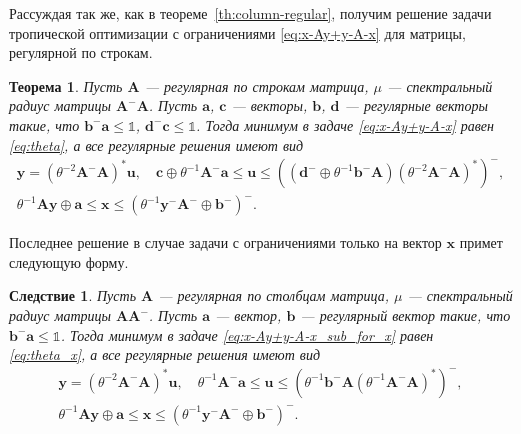 \documentclass[specialist,
               substylefile = spbu.rtx,
               subf,href,colorlinks=true, 12pt]{disser}
\newtheorem{theorem}{Теорема}
\newtheorem{corollary}{Следствие}
\theoremstyle{definition}
\begin{document}
Рассуждая так же, как в теореме~\ref{th:column-regular}, получим решение задачи тропической оптимизации с ограничениями \eqref{eq:x-Ay+y-A-x} для матрицы, регулярной по строкам.
\begin{theorem}\label{th:row-regular}
Пусть $\bm{A}$ --- регулярная по строкам матрица, $\mu$ --- спектральный радиус матрицы $\bm{A}^{-}\bm{A}$. Пусть $\bm{a}$, $\bm{c}$ --- векторы, $\bm{b}$, $\bm{d}$ --- регулярные векторы такие, что $\bm{b}^{-}\bm{a}\leq\mathbb{1}$, $\bm{d}^{-}\bm{c}\leq\mathbb{1}$. 
Тогда минимум в задаче \eqref{eq:x-Ay+y-A-x} равен \eqref{eq:theta}, а все регулярные решения имеют вид
\begin{gather*}
\bm{y}=(\theta^{-2}\bm{A}^{-}\bm{A})^{\ast}\bm{u},
\quad
\bm{c}
\oplus
\theta^{-1}\bm{A}^{-}\bm{a}
\leq
\bm{u}
\leq
((\bm{d}^{-}\oplus\theta^{-1}\bm{b}^{-}\bm{A})
(\theta^{-2}\bm{A}^{-}\bm{A})^{\ast})^{-},\\
\theta^{-1}\bm{A}\bm{y}\oplus\bm{a}
\leq
\bm{x}
\leq
(\theta^{-1}\bm{y}^{-}\bm{A}^{-}\oplus\bm{b}^{-})^{-}.
\end{gather*}
\end{theorem}

Последнее решение в случае задачи с ограничениями только на вектор $\bm{x}$ примет следующую форму.
\begin{corollary}\label{cor:row-regular_sub_x}
Пусть $\bm{A}$ --- регулярная по столбцам матрица, $\mu$ --- спектральный радиус матрицы $\bm{A}\bm{A}^{-}$. Пусть $\bm{a}$ --- вектор, $\bm{b}$ --- регулярный вектор такие, что $\bm{b}^{-}\bm{a}\leq\mathbb{1}$.
Тогда минимум в задаче \eqref{eq:x-Ay+y-A-x_sub_for_x} равен \eqref{eq:theta_x}, а все регулярные решения имеют вид
\begin{equation*}
\begin{gathered}
\bm{y}
=
(\theta^{-2}\bm{A}^{-}\bm{A})^{\ast}\bm{u},
\quad
\theta^{-1}\bm{A}^{-}\bm{a}\leq\bm{u}\leq(\theta^{-1}\bm{b}^{-}\bm{A}(\theta^{-1}\bm{A}^{-}\bm{A})^{\ast})^{-},\\
\theta^{-1}\bm{A}\bm{y}
\oplus\bm{a}
\leq\bm{x}
\leq
(\theta^{-1}\bm{y}^{-}\bm{A}^{-}\oplus\bm{b}^{-})^{-}.
\end{gathered}
\end{equation*}
\end{corollary}
\end{document}

